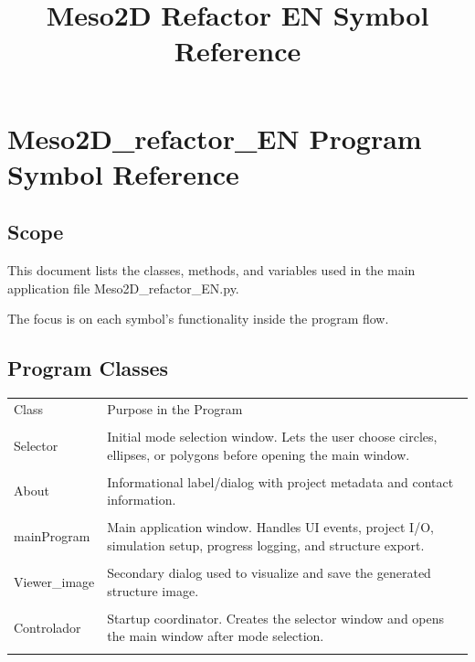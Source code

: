 ﻿\documentclass[11pt,a4paper]{article}
\title{Meso2D Refactor EN Symbol Reference}
\author{}
\date{}
\begin{document}
\maketitle
\tableofcontents
\newpage
\section*{Meso2D\_refactor\_EN Program Symbol Reference}

\subsection*{Scope}
This document lists the classes, methods, and variables used in the main application file Meso2D\_refactor\_EN.py.

The focus is on each symbol's functionality inside the program flow.


\subsection*{Program Classes}

\begin{longtable}{|p{}|p{}|}
\hline
Class & Purpose in the Program \\\\
\hline
Selector & Initial mode selection window. Lets the user choose circles, ellipses, or polygons before opening the main window. \\\\
\hline
About & Informational label/dialog with project metadata and contact information. \\\\
\hline
mainProgram & Main application window. Handles UI events, project I/O, simulation setup, progress logging, and structure export. \\\\
\hline
Viewer\_image & Secondary dialog used to visualize and save the generated structure image. \\\\
\hline
Controlador & Startup coordinator. Creates the selector window and opens the main window after mode selection. \\\\
\hline
\end{longtable}
\end{document}
